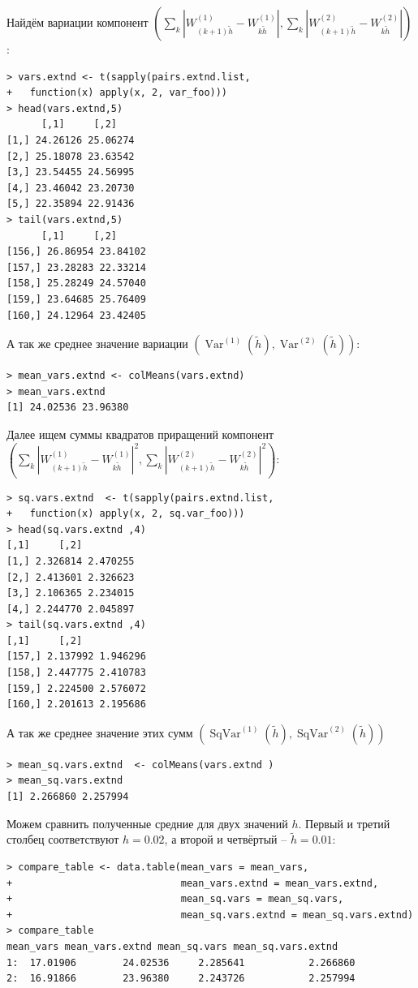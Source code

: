 \documentclass[14pt,a4paper]{scrartcl}
\begin{document}
Найдём вариации компонент $\left(\sum\limits_{k}\left|W_{(k+1) \tilde{h}}^{(1)}-W_{k \tilde{h}}^{(1)}\right|, \sum\limits_{k}\left|W_{(k+1) \tilde{h}}^{(2)}-W_{k \tilde{h}}^{(2)}\right|\right)$:

\begin{verbatim}
> vars.extnd <- t(sapply(pairs.extnd.list, 
+	function(x) apply(x, 2, var_foo)))
> head(vars.extnd,5)
	  [,1]     [,2]
[1,] 24.26126 25.06274
[2,] 25.18078 23.63542
[3,] 23.54455 24.56995
[4,] 23.46042 23.20730
[5,] 22.35894 22.91436
> tail(vars.extnd,5)
	  [,1]     [,2]
[156,] 26.86954 23.84102
[157,] 23.28283 22.33214
[158,] 25.28249 24.57040
[159,] 23.64685 25.76409
[160,] 24.12964 23.42405
\end{verbatim}

А так же среднее значение вариации $\left(\operatorname{Var}^{(1)}(\tilde{h}), \operatorname{Var}^{(2)}(\tilde{h})\right)$:

\begin{verbatim}
> mean_vars.extnd <- colMeans(vars.extnd)
> mean_vars.extnd
[1] 24.02536 23.96380
\end{verbatim}

Далее ищем суммы квадратов приращений компонент \\ $\left(\sum\limits_{k}\left|W_{(k+1) \tilde{h}}^{(1)}-W_{k \tilde{h}}^{(1)}\right|^2, \sum\limits_{k}\left|W_{(k+1) \tilde{h}}^{(2)}-W_{k \tilde{h}}^{(2)}\right|^2\right)$:

\begin{verbatim}
> sq.vars.extnd  <- t(sapply(pairs.extnd.list, 
+	function(x) apply(x, 2, sq.var_foo)))
> head(sq.vars.extnd ,4)
[,1]     [,2]
[1,] 2.326814 2.470255
[2,] 2.413601 2.326623
[3,] 2.106365 2.234015
[4,] 2.244770 2.045897
> tail(sq.vars.extnd ,4)
[,1]     [,2]
[157,] 2.137992 1.946296
[158,] 2.447775 2.410783
[159,] 2.224500 2.576072
[160,] 2.201613 2.195686
\end{verbatim}

А так же среднее значение этих сумм $(\operatorname{SqVar}^{(1)}(\tilde{h}), \operatorname{SqVar}^{(2)}(\tilde{h}))$

\begin{verbatim}
> mean_sq.vars.extnd  <- colMeans(vars.extnd )
> mean_sq.vars.extnd 
[1] 2.266860 2.257994
\end{verbatim}

Можем сравнить полученные средние для двух значений $h$. Первый и третий столбец соответствуют $h = 0.02$, а второй и четвёртый -- $\tilde{h} = 0.01$:

\begin{verbatim}
> compare_table <- data.table(mean_vars = mean_vars,
+                             mean_vars.extnd = mean_vars.extnd,
+                             mean_sq.vars = mean_sq.vars,
+                             mean_sq.vars.extnd = mean_sq.vars.extnd)
> compare_table
mean_vars mean_vars.extnd mean_sq.vars mean_sq.vars.extnd
1:  17.01906        24.02536     2.285641           2.266860
2:  16.91866        23.96380     2.243726           2.257994
\end{verbatim}
\end{document}

